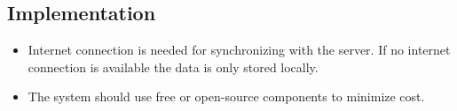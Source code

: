 \subsection*{Implementation}
\begin{itemize}
	\item Internet connection is needed for synchronizing with the server. If no internet connection is available the data is only stored locally.
	\item The system should use free or open-source components to minimize cost.
\end{itemize}